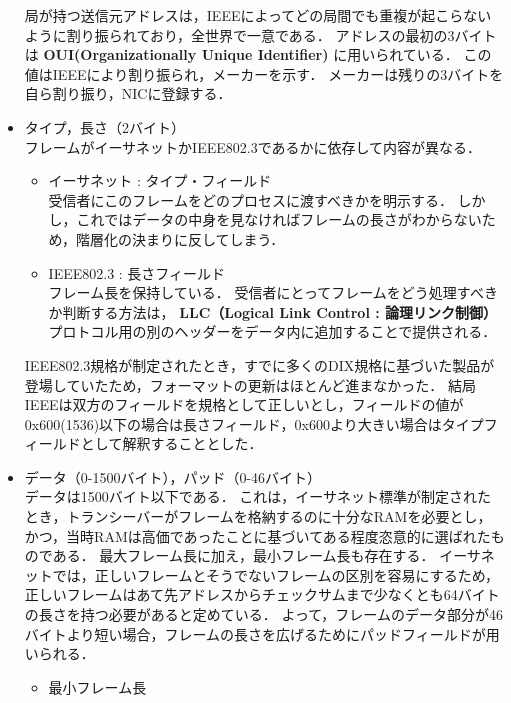 \documentclass[a4paper]{ltjsarticle}
\providecommand{\tightlist}{%
  \setlength{\itemsep}{0pt}\setlength{\parskip}{0pt}}
\begin{document}
\begin{itemize}
  局が持つ送信元アドレスは，IEEEによってどの局間でも重複が起こらないように割り振られており，全世界で一意である．
  アドレスの最初の3バイトは \textbf{OUI(Organizationally Unique
  Identifier)} に用いられている．
  この値はIEEEにより割り振られ，メーカーを示す．
  メーカーは残りの3バイトを自ら割り振り，NICに登録する．
\item
  タイプ，長さ（2バイト）\\
  フレームがイーサネットかIEEE802.3であるかに依存して内容が異なる．

  \begin{itemize}
  \tightlist
  \item
    イーサネット : タイプ・フィールド\\
    受信者にこのフレームをどのプロセスに渡すべきかを明示する．
    しかし，これではデータの中身を見なければフレームの長さがわからないため，階層化の決まりに反してしまう．
  \item
    IEEE802.3 : 長さフィールド\\
    フレーム長を保持している．
    受信者にとってフレームをどう処理すべきか判断する方法は，
    \textbf{LLC（Logical Link Control : 論理リンク制御）}
    プロトコル用の別のヘッダーをデータ内に追加することで提供される．
  \end{itemize}

  IEEE802.3規格が制定されたとき，すでに多くのDIX規格に基づいた製品が登場していたため，フォーマットの更新はほとんど進まなかった．
  結局IEEEは双方のフィールドを規格として正しいとし，フィールドの値が0x600(1536)以下の場合は長さフィールド，0x600より大きい場合はタイプフィールドとして解釈することとした．
\item
  データ（0-1500バイト），パッド（0-46バイト）\\
  データは1500バイト以下である．
  これは，イーサネット標準が制定されたとき，トランシーバーがフレームを格納するのに十分なRAMを必要とし，かつ，当時RAMは高価であったことに基づいてある程度恣意的に選ばれたものである．
  最大フレーム長に加え，最小フレーム長も存在する．
  イーサネットでは，正しいフレームとそうでないフレームの区別を容易にするため，正しいフレームはあて先アドレスからチェックサムまで少なくとも64バイトの長さを持つ必要があると定めている．
  よって，フレームのデータ部分が46バイトより短い場合，フレームの長さを広げるためにパッドフィールドが用いられる．

  \begin{itemize}
  \tightlist
  \item
    最小フレーム長


\end{itemize}
\end{itemize}
\end{document}
